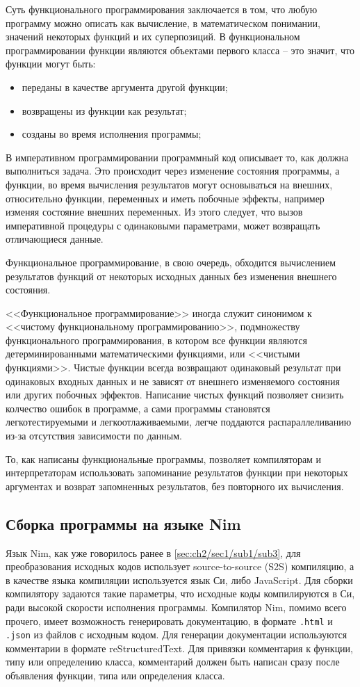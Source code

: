 Суть функционального программирования заключается в том,
что любую программу можно описать как вычисление, в математическом понимании,
значений некоторых функций и их суперпозиций.
В функциональном программировании функции являются объектами первого
класса -- это значит, что функции могут быть:
\begin{itemize}
    \item переданы в качестве аргумента другой функции;
    \item возвращены из функции как результат;
    \item созданы во время исполнения программы;
\end{itemize}

В императивном программировании программный код
описывает то, как должна выполниться задача. Это
происходит через изменение состояния программы, а
функции, во время вычисления результатов могут основываться
на внешних, относительно функции, переменных и иметь
побочные эффекты, например изменяя состояние внешних
переменных. Из этого следует, что вызов
императивной процедуры с одинаковыми параметрами,
может возвращать отличающиеся данные.

Функциональное программирование, в свою очередь, обходится
вычислением результатов функций от некоторых исходных данных
без изменения внешнего состояния.

<<Функциональное программирование>> иногда служит синонимом к 
<<чистому функциональному программированию>>, подмножеству
функционального программирования, в котором все функции являются
детерминированными математическими функциями, или <<чистыми функциями>>.
Чистые функции всегда возвращают одинаковый результат при одинаковых
входных данных и не зависят от внешнего изменяемого состояния или других
побочных эффектов.
Написание чистых функций позволяет снизить колчество ошибок в программе,
а сами программы становятся легкотестируемыми и легкоотлаживаемыми, легче
поддаются распараллеливанию из-за отсутствия зависимости по данным.

То, как написаны функциональные программы, позволяет компиляторам и
интерпретаторам использовать запоминание результатов функции при некоторых
аргументах и возврат запомненных результатов, без повторного их вычисления.

\subsection{Сборка программы на языке Nim}\label{sec:ch3/sec1/sub1}
Язык Nim, как уже говорилось ранее в \autoref{sec:ch2/sec1/sub1/sub3}, для преобразования
исходных кодов использует source-to-source (S2S) компиляцию, а в качестве языка компиляции
используется язык Си, либо JavaScript. Для сборки {\ProgModule} компилятору задаются 
такие параметры, что исходные коды компилируются в Си, ради высокой скорости исполнения
программы.
Компилятор Nim, помимо всего прочего, имеет возможность генерировать документацию, в формате
\verb|.html| и \verb|.json| из файлов с исходным кодом.
Для генерации документации используются комментарии в формате reStructuredText.
Для привязки комментария к функции, типу или определению класса,
комментарий должен быть написан сразу после объявления функции,
типа или определения класса.

